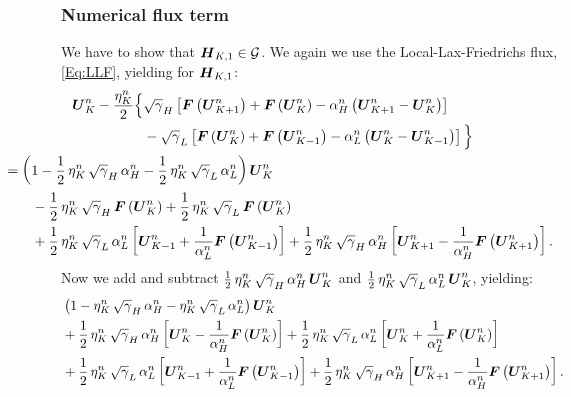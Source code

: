 \documentclass[10pt,preprint]{aastex}
\begin{document}
\subsubsection{Numerical flux term}
We have to show that $\boldsymbol{H}_{K,1}\in\mathcal{G}$. We again we use the Local-Lax-Friedrichs flux, \eqref{Eq:LLF}, yielding for $\boldsymbol{H}_{K,1}$:
\begin{align}
    \bU^{n}_{K}-\f{\eta^{n}_{K}}{2}\Big\{&\sqrtgm_{H}\left[\bF\left(\bU^{n}_{K+1}\right)+\bF\left(\bU^{n}_{K}\right)-\alpha^{n}_{H}\left(\bU^{n}_{K+1}-\bU^{n}_{K}\right)\right]\\
    &-\sqrtgm_{L}\left[\bF\left(\bU^{n}_{K}\right)+\bF\left(\bU^{n}_{K-1}\right)-\alpha^{n}_{L}\left(\bU^{n}_{K}-\bU^{n}_{K-1}\right)\right]\Big\}\\
    &\hspace{-10em}=\left(1-\f{1}{2}\,\eta^{n}_{K}\,\sqrtgm_{H}\,\alpha^{n}_{H}-\f{1}{2}\,\eta^{n}_{K}\,\sqrtgm_{L}\,\alpha^{n}_{L}\right)\bU^{n}_{K}\\
    &\hspace{-8em}-\f{1}{2}\,\eta^{n}_{K}\,\sqrtgm_{H}\,\bF\left(\bU^{n}_{K}\right)+\f{1}{2}\,\eta^{n}_{K}\,\sqrtgm_{L}\,\bF\left(\bU^{n}_{K}\right)\\
    &\hspace{-8em}+\f{1}{2}\,\eta^{n}_{K}\,\sqrtgm_{L}\,\alpha^{n}_{L}\left[\bU^{n}_{K-1}+\f{1}{\alpha^{n}_{L}}\bF\left(\bU^{n}_{K-1}\right)\right]+\f{1}{2}\,\eta^{n}_{K}\,\sqrtgm_{H}\,\alpha^{n}_{H}\left[\bU^{n}_{K+1}-\f{1}{\alpha^{n}_{H}}\bF\left(\bU^{n}_{K+1}\right)\right].
\end{align}
Now we add and subtract $\frac{1}{2}\,\eta^{n}_{K}\,\sqrt{\gamma}_{H}\,\alpha^{n}_{H}\,\boldsymbol{U}^{n}_{K}$ and $\frac{1}{2}\,\eta^{n}_{K}\,\sqrt{\gamma}_{L}\,\alpha^{n}_{L}\,\boldsymbol{U}^{n}_{K}$, yielding:
\begin{align}
    &\left(1-\eta^{n}_{K}\,\sqrt{\gamma}_{H}\,\alpha^{n}_{H}-\eta^{n}_{K}\,\sqrt{\gamma}_{L}\,\alpha^{n}_{L}\right)\boldsymbol{U}^{n}_{K}\\
    &+\frac{1}{2}\,\eta^{n}_{K}\,\sqrt{\gamma}_{H}\,\alpha^{n}_{H}\left[\boldsymbol{U}^{n}_{K}-\frac{1}{\alpha^{n}_{H}}\boldsymbol{F}\left(\boldsymbol{U}^{n}_{K}\right)\right]+\frac{1}{2}\,\eta^{n}_{K}\,\sqrt{\gamma}_{L}\,\alpha^{n}_{L}\left[\boldsymbol{U}^{n}_{K}+\frac{1}{\alpha^{n}_{L}}\boldsymbol{F}\left(\boldsymbol{U}^{n}_{K}\right)\right]\\
    &+\frac{1}{2}\,\eta^{n}_{K}\,\sqrt{\gamma}_{L}\,\alpha^{n}_{L}\left[\boldsymbol{U}^{n}_{K-1}+\frac{1}{\alpha^{n}_{L}}\boldsymbol{F}\left(\boldsymbol{U}^{n}_{K-1}\right)\right]+\frac{1}{2}\,\eta^{n}_{K}\,\sqrt{\gamma}_{H}\,\alpha^{n}_{H}\left[\boldsymbol{U}^{n}_{K+1}-\frac{1}{\alpha^{n}_{H}}\boldsymbol{F}\left(\boldsymbol{U}^{n}_{K+1}\right)\right].
\end{align}
\end{document}

